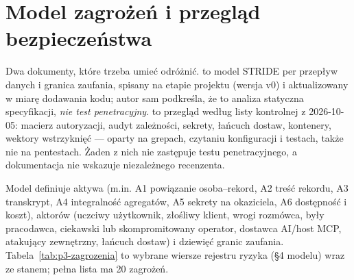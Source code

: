 \section{Model zagrożeń i przegląd bezpieczeństwa}
\label{sec:p3-zagrozenia}

Dwa dokumenty, które trzeba umieć odróżnić.  to model
STRIDE per przepływ danych i granica zaufania, spisany na etapie projektu (wersja
v0) i aktualizowany w miarę dodawania kodu; autor sam podkreśla, że to
analiza statyczna specyfikacji, \emph{nie test penetracyjny}. 
to przegląd według listy kontrolnej z 2026-10-05: macierz autoryzacji, audyt
zależności, sekrety, łańcuch dostaw, kontenery, wektory wstrzyknięć --- oparty na
grepach, czytaniu konfiguracji i testach, także nie na pentestach. Żaden z nich nie
zastępuje testu penetracyjnego, a dokumentacja nie wskazuje niezależnego
recenzenta.

Model definiuje aktywa (m.in. A1 powiązanie osoba--rekord, A2 treść rekordu, A3
transkrypt, A4 integralność agregatów, A5 sekrety na okaziciela, A6 dostępność i
koszt), aktorów (uczciwy użytkownik, złośliwy klient, wrogi rozmówca, były pracodawca,
ciekawski lub skompromitowany operator, dostawca AI/host MCP, atakujący zewnętrzny,
łańcuch dostaw) i dziewięć granic zaufania. Tabela~\ref{tab:p3-zagrozenia} to
wybrane wiersze rejestru ryzyka (§4 modelu) wraz ze stanem; pełna lista ma 20 zagrożeń.

